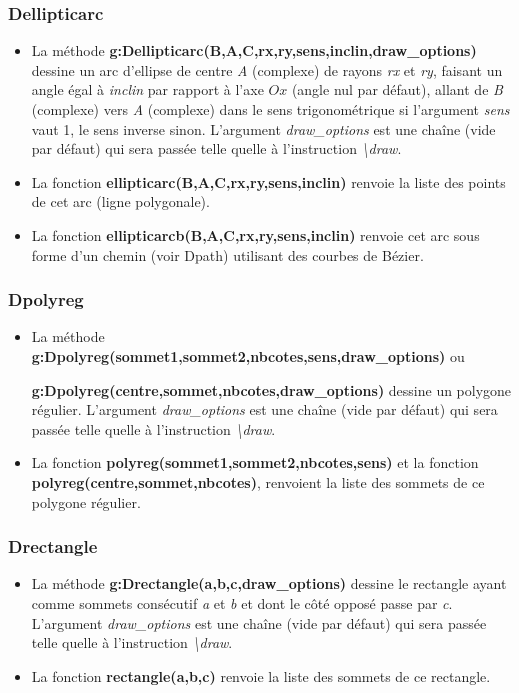 \subsubsection{Dellipticarc}
\begin{itemize}
    \item La méthode \textbf{g:Dellipticarc(B,A,C,rx,ry,sens,inclin,draw\_options)} dessine un arc d'ellipse de centre \emph{A} (complexe) de rayons \emph{rx} et \emph{ry}, faisant un angle égal à \emph{inclin} par rapport à l'axe \(Ox\) (angle nul par défaut), allant de \emph{B} (complexe) vers \emph{A} (complexe) dans le sens trigonométrique si l'argument \emph{sens} vaut 1, le sens inverse sinon. L'argument \emph{draw\_options} est une chaîne (vide par défaut) qui sera passée telle quelle à l'instruction \emph{\textbackslash draw}.
    \item La fonction \textbf{ellipticarc(B,A,C,rx,ry,sens,inclin)} renvoie la liste des points de cet arc (ligne polygonale). 
    \item La fonction \textbf{ellipticarcb(B,A,C,rx,ry,sens,inclin)} renvoie cet arc sous forme d'un chemin (voir Dpath) utilisant des courbes de Bézier.
\end{itemize}

\subsubsection{Dpolyreg}
\begin{itemize}
    \item La méthode \textbf{g:Dpolyreg(sommet1,sommet2,nbcotes,sens,draw\_options)} ou \par \textbf{g:Dpolyreg(centre,sommet,nbcotes,draw\_options)} dessine un polygone régulier. L'argument \emph{draw\_options} est une chaîne (vide par défaut) qui sera passée telle quelle à l'instruction \emph{\textbackslash draw}.
    \item La fonction \textbf{polyreg(sommet1,sommet2,nbcotes,sens)} et la fonction \textbf{polyreg(centre,sommet,nbcotes)}, renvoient la liste des sommets de ce polygone régulier.
\end{itemize}

\subsubsection{Drectangle}
\begin{itemize}
    \item La méthode \textbf{g:Drectangle(a,b,c,draw\_options)} dessine le rectangle ayant comme sommets consécutif \emph{a} et \emph{b} et dont le côté opposé passe par \emph{c}. L'argument \emph{draw\_options} est une chaîne (vide par défaut) qui sera passée telle quelle à l'instruction \emph{\textbackslash draw}.
    \item La fonction \textbf{rectangle(a,b,c)} renvoie la liste des sommets de ce rectangle.
\end{itemize}

